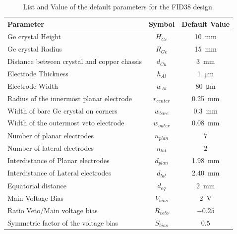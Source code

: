 \begin{table}[]
\centering
\begin{tabular}{l c S}
Parameter                                   & Symbol        & {Default Value} \\ \hline \hline
Ge crystal Height                           & $H_{Ge}$      & \SI{10}{\mm}  \\
Ge crystal Radius                           & $R_{Ge}$      & \SI{15}{\mm}    \\
Distance between crystal and copper chassis & $d_{Cu}$      & \SI{3}{\mm}     \\
Electrode Thickness                         & $h_{Al}$      & \SI{1}{\micro\meter}   \\
Electrode Width                             & $w_{Al}$      & \SI{80}{\micro\meter}  \\
Radius of the innermost planar electrode    & $r_{center}$   & \SI{0.25}{\mm}   \\
Width of bare Ge crystal on corners      & $w_{bare}$    & \SI{0.3}{\mm}  \\
Width of the outermost veto electrode    & $w_{outer}$    & \SI{0.08}{\mm}  \\
Number of planar electrodes                 & $n_{plan}$  & {$7$}             \\
Number of lateral electrodes                & $n_{lat}$ & {$2$}             \\
Interdistance of Planar electrodes          & $d_{plan}$  & \SI{1.98}{\mm}  \\
Interdistance of Lateral electrodes         & $d_{lat}$ & \SI{2.40}{\mm}  \\
Equatorial distance & $d_{eq}$ & \SI{2}{\mm}  \\
Main Voltage Bias                           & $V_{bias}$    & \SI{2}{\volt}      \\
Ratio Veto/Main voltage bias                & $R_{veto}$    & {$-0.25$}         \\
Symmetric factor of the voltage bias        & $S_{bias}$    & {$0.5$}         
\end{tabular}
\caption{List and Value of the default parameters for the FID38 design.}
\label{tab:fid38-default-parameters}
\end{table}

